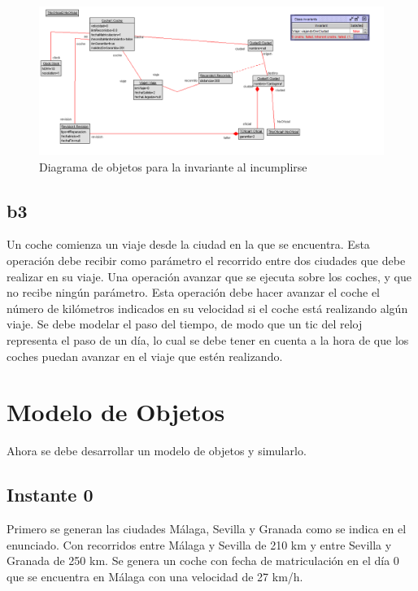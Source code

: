 \documentclass[12pt.a4paper]{article}
\begin{document}
\begin{figure}[H]
     \includegraphics[width=1\linewidth]{Soils/dinamico_inv5_false.png}
     \caption{Diagrama de objetos para la invariante al incumplirse}
\end{figure}
    
\subsection{b3}
Un coche comienza un viaje desde la ciudad en la que se encuentra. Esta operación debe recibir como parámetro el recorrido entre dos ciudades que debe realizar en su viaje.
Una operación avanzar que se ejecuta sobre los coches, y que no recibe ningún parámetro. Esta operación debe hacer avanzar el coche el número de kilómetros indicados en su velocidad si el coche está realizando algún viaje. Se debe modelar el paso del tiempo, de modo que un tic del reloj representa el paso de un día, lo cual se debe tener en cuenta a la hora de que los coches puedan avanzar en el viaje que estén realizando.

\section{Modelo de Objetos}
Ahora se debe desarrollar un modelo de objetos y simularlo.


\subsection{Instante 0}
Primero se generan las ciudades Málaga, Sevilla y Granada como se indica en el enunciado. Con recorridos entre Málaga y Sevilla de 210 km y entre Sevilla y Granada de 250 km. Se genera un coche con fecha de matriculación en el día 0 que se encuentra en Málaga con una velocidad de 27 km/h.
\end{document}
